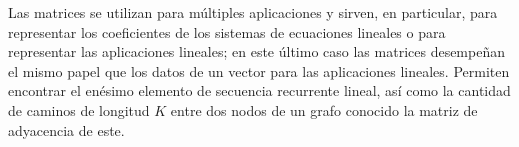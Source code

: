 Las matrices se utilizan para múltiples aplicaciones y sirven, en particular, para representar los coeficientes de los sistemas de ecuaciones lineales o para representar las aplicaciones lineales; en este último caso las matrices desempeñan el mismo papel que los datos de un vector para las aplicaciones lineales. Permiten encontrar el enésimo elemento de secuencia recurrente lineal, así como la cantidad de caminos de longitud $K$ entre dos nodos de un grafo conocido la matriz de adyacencia de este. 